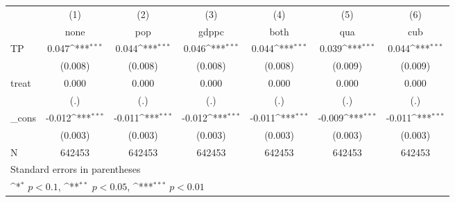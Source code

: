 {
\def\sym#1{\ifmmode^{#1}\else\(^{#1}\)\fi}
\begin{tabular}{l*{6}{c}}
\hline\hline
            &\multicolumn{1}{c}{(1)}&\multicolumn{1}{c}{(2)}&\multicolumn{1}{c}{(3)}&\multicolumn{1}{c}{(4)}&\multicolumn{1}{c}{(5)}&\multicolumn{1}{c}{(6)}\\
            &\multicolumn{1}{c}{none}&\multicolumn{1}{c}{pop}&\multicolumn{1}{c}{gdppc}&\multicolumn{1}{c}{both}&\multicolumn{1}{c}{qua}&\multicolumn{1}{c}{cub}\\
\hline
TP          &       0.047\sym{***}&       0.044\sym{***}&       0.046\sym{***}&       0.044\sym{***}&       0.039\sym{***}&       0.044\sym{***}\\
            &     (0.008)         &     (0.008)         &     (0.008)         &     (0.008)         &     (0.009)         &     (0.009)         \\
[1em]
treat       &       0.000         &       0.000         &       0.000         &       0.000         &       0.000         &       0.000         \\
            &         (.)         &         (.)         &         (.)         &         (.)         &         (.)         &         (.)         \\
[1em]
\_cons      &      -0.012\sym{***}&      -0.011\sym{***}&      -0.012\sym{***}&      -0.011\sym{***}&      -0.009\sym{***}&      -0.011\sym{***}\\
            &     (0.003)         &     (0.003)         &     (0.003)         &     (0.003)         &     (0.003)         &     (0.003)         \\
\hline
N           &      642453         &      642453         &      642453         &      642453         &      642453         &      642453         \\
\hline\hline
\multicolumn{7}{l}{\footnotesize Standard errors in parentheses}\\
\multicolumn{7}{l}{\footnotesize \sym{*} \(p<0.1\), \sym{**} \(p<0.05\), \sym{***} \(p<0.01\)}\\
\end{tabular}
}

